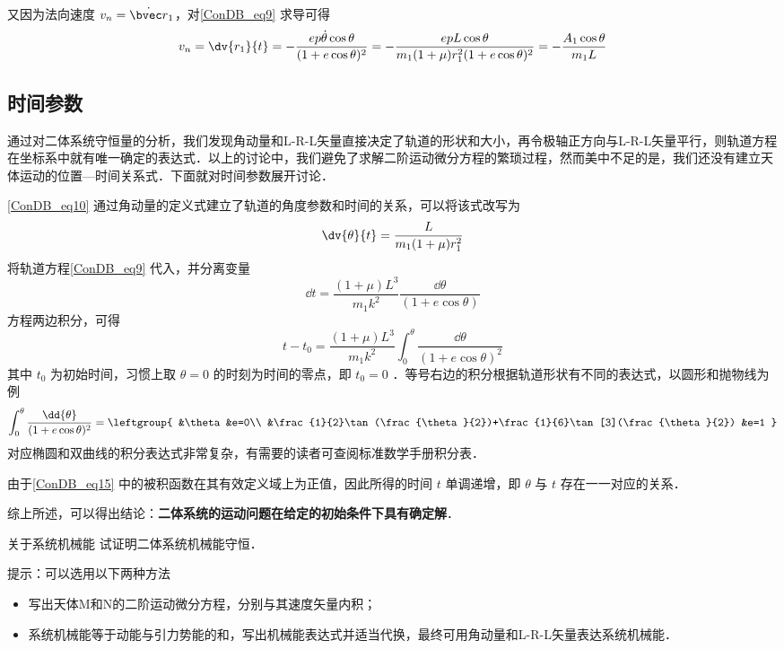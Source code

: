 又因为法向速度 $v_n=\dot{\bvec r}_1$，对\autoref{ConDB_eq9} 求导可得
\begin{equation}
v_n =\dv{r_1}{t}=-\frac{ep\dot{\theta}\cos\theta}{(1+e\cos\theta)^2}=-\frac{epL\cos\theta}{m_1(1+\mu)r_1^2(1+e\cos\theta)^2}=-\frac{A_1\cos\theta}{m_1L}
\end{equation}

\subsection{时间参数}
通过对二体系统守恒量的分析，我们发现角动量和L-R-L矢量直接决定了轨道的形状和大小，再令极轴正方向与L-R-L矢量平行，则轨道方程在坐标系中就有唯一确定的表达式．以上的讨论中，我们避免了求解二阶运动微分方程的繁琐过程，然而美中不足的是，我们还没有建立天体运动的位置—时间关系式．下面就对时间参数展开讨论．

\autoref{ConDB_eq10} 通过角动量的定义式建立了轨道的角度参数和时间的关系，可以将该式改写为
\begin{equation}
\dv{\theta}{t}=\frac{L}{ m_1(1+\mu)r_1^2}
\end{equation}
将轨道方程\autoref{ConDB_eq9} 代入，并分离变量
\begin{equation}
\dd{t}=\frac{(1+\mu)L^3}{ m_1k^2}\frac{\dd{\theta}}{(1+e\cos\theta)}
\end{equation}
方程两边积分，可得
\begin{equation}\label{ConDB_eq15}
t-t_0 = \frac{(1+\mu)L^3}{ m_1k^2}\int_0^{\theta} \frac{\dd{\theta}}{(1+e\cos\theta)^2}
\end{equation}
其中 $t_0$ 为初始时间，习惯上取 $\theta=0$ 的时刻为时间的零点，即 $t_0=0$ ．等号右边的积分根据轨道形状有不同的表达式，以圆形和抛物线为例
\begin{equation}
\int_0^{\theta} \frac{\dd{\theta}}{(1+e\cos\theta)^2} =
\leftgroup{
&\theta &e=0\\
&\frac{1}{2}\tan(\frac{\theta}{2})+\frac{1}{6}\tan[3](\frac{\theta}{2}) &e=1
} 
\end{equation}
对应椭圆和双曲线的积分表达式非常复杂，有需要的读者可查阅标准数学手册积分表．

由于\autoref{ConDB_eq15} 中的被积函数在其有效定义域上为正值，因此所得的时间 $t$ 单调递增，即 $\theta$ 与 $t$ 存在一一对应的关系．

综上所述，可以得出结论：\textbf{二体系统的运动问题在给定的初始条件下具有确定解}．

\begin{exercise}{关于系统机械能}\label{ConDB_exe1}
试证明二体系统机械能守恒．

提示：可以选用以下两种方法
\begin{itemize}
\item 写出天体M和N的二阶运动微分方程，分别与其速度矢量内积；
\item 系统机械能等于动能与引力势能的和，写出机械能表达式并适当代换，最终可用角动量和L-R-L矢量表达系统机械能．
\end{itemize}
\end{exercise}
